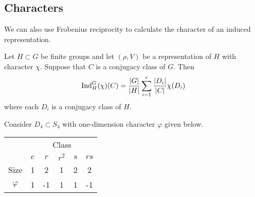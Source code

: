 \subsection{Characters}

We can also use Frobenius reciprocity to calculate the character of an induced representation.

\begin{theorem}
    Let $H \subset G$ be finite groups and let $(\rho, V)$ be a representation of $H$ with character $\chi$. Suppose that $C$ is a conjugacy class of $G$. Then
    \[ \operatorname{Ind}_H^G(\chi)(C) = \frac{\lvert G \rvert}{\lvert H \rvert} \sum_{i=1}^r \frac{\lvert D_i \rvert}{\lvert C \rvert} \chi(D_i) \]
    where each $D_i$ is a conjugacy class of $H$. 
\end{theorem}

\begin{example}
    Consider $D_4 \subset S_4$ with one-dimension character $\varphi$ given below.
    \begin{center}
        \begin{tabular}{cccccc}
            \toprule
            & \multicolumn{5}{c}{Class} \\
            \cmidrule{2-6}
            & $e$ & $r$ & $r^2$ & $s$ & $rs$ \\
            \midrule
            Size & 1 & 2 & 1 & 2 & 2 \\
            \midrule
            $\varphi$ & 1 & -1 & 1 & 1 & -1 \\
            \bottomrule 
        \end{tabular}
    \end{center}
\end{example}
